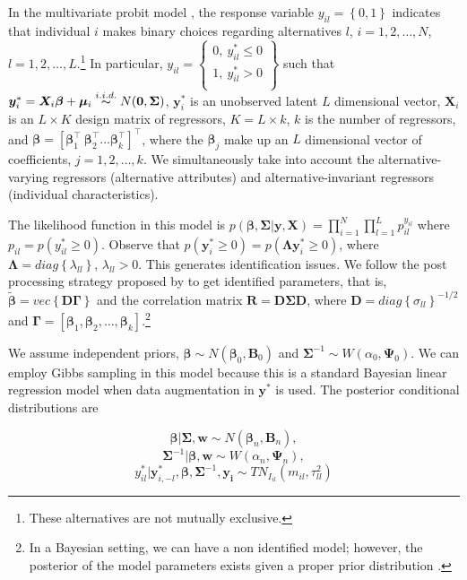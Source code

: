 In the multivariate probit model \cite{Edwards2003}, the response variable $y_{il}=\left\{0,1\right\}$ indicates that individual $i$ makes binary choices regarding alternatives $l$, $i=1,2,\dots,N$, $l=1,2,\dots,L$.\footnote{These alternatives are not mutually exclusive.} In particular,
$y_{il}=\begin{Bmatrix}
	0, \ y_{il}^*\leq 0 \\ 
	1, \ y_{il}^*> 0 \\ 
\end{Bmatrix}$
such that $\bm{y}_{i}^*=\bm{X}_{i}\bm{\beta}+\bm{\mu}_{i}\stackrel{i.i.d.} {\thicksim}{N}(\bm0,\bm{\Sigma})$, $\bm{y}_i^*$ is an unobserved latent $L$ dimensional vector, $\bm{X}_{i}$ is an $L\times K$ design matrix of regressors, $K=L\times k$, $k$ is the number of regressors, and $\bm{\beta}=\left[\bm{\beta}_1^{\top} \ \bm{\beta}_2^{\top} \dots  \bm{\beta}_k^{\top}\right]^{\top}$, where the $\bm{\beta}_j$ make up an $L$ dimensional vector of coefficients, $j=1,2,\dots,k$. We simultaneously take into account the alternative-varying regressors (alternative attributes) and alternative-invariant regressors (individual characteristics).

The likelihood function in this model is $p(\bm{\beta},\bm{\Sigma}|\bm{y},\bm{X})=\prod_{i=1}^N\prod_{l=1}^L p_{il}^{y_{il}}$ where $p_{il}=p(y_{il}^*\geq 0)$.
Observe that $p(\bm{y}_{i}^*\geq 0)=p(\bm{\Lambda}\bm{y}_{i}^*\geq 0)$, where $\bm{\Lambda}=diag\left\{\lambda_{ll}\right\}$, $\lambda_{ll}>0$.
This generates identification issues.
We follow the post processing strategy proposed by \cite{Edwards2003} to get identified parameters, that is, $\tilde{\bm{\beta}}=vec\left\{\bm{D}\bm{\Gamma}\right\}$ and the correlation matrix $\bm{R}=\bm{D}\bm{\Sigma}\bm{D}$, where $\bm{D}=diag\left\{\sigma_{ll}\right\}^{-1/2}$ and $\bm{\Gamma}=\left[\bm{\beta}_1,\bm{\beta}_2,\dots,\bm{\beta}_k\right]$.\footnote{In a Bayesian setting, we can have a non identified model; however, the posterior of the model parameters exists given a proper prior distribution \cite{Edwards2003}.}

We assume independent priors, $\bm{\beta}\sim{N}(\bm{\beta}_0,\bm{B}_0)$ and $\bm{\Sigma}^{-1}\sim{W}(\alpha_0,\bm{\Psi}_0)$.
We can employ Gibbs sampling in this model because this is a standard Bayesian linear regression model when data augmentation in $\bm{y}^*$ is used.
The posterior conditional distributions are

\begin{equation*}
	\bm{\beta}|\bm{\Sigma},\bm{w}\sim{N}(\bm{\beta}_n,\bm{B}_n),
\end{equation*}
\begin{equation*}
	\bm{\Sigma}^{-1}|\bm{\beta},\bm{w}\sim{W}(\alpha_n,\bm{\Psi}_n),
\end{equation*}
\begin{equation*}
	y_{il}^*|\bm{y}_{i,-l}^*,\bm{\beta},\bm{\Sigma}^{-1},\bm{y_i}\sim{T}{N}_{I_{il}}(m_{il},\tau_{ll}^2)
\end{equation*}


